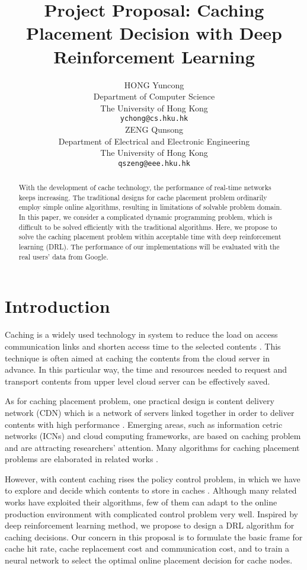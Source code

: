 \documentclass{article}
\title{Project Proposal: Caching Placement Decision with Deep Reinforcement Learning}
\author{
  HONG Yuncong \\ %
  Department of Computer Science \\
  The University of Hong Kong \\
  \texttt{ychong@cs.hku.hk} \\
  \And %
  ZENG Qunsong \\
  Department of Electrical and Electronic Engineering \\
  The University of Hong Kong \\
  \texttt{qszeng@eee.hku.hk} \\
}
\begin{document}
\maketitle

\begin{abstract}
  
  With the development of cache technology, the performance of real-time networks keeps increasing. The traditional designs for cache placement problem ordinarily employ simple online algorithms, resulting in limitations of solvable problem domain. In this paper, we consider a complicated dynamic programming problem, which is difficult to be solved efficiently with the traditional algorithms. Here, we propose to solve the caching placement problem within acceptable time with deep reinforcement learning (DRL). The performance of our implementations will be evaluated with the real users' data from Google.
\end{abstract}

\section{Introduction}

  Caching is a widely used technology in system to reduce the load on access communication links and shorten access time to the selected contents \cite{general-cache}. This technique is often aimed at caching the contents from the cloud server in advance. In this particular way, the time and resources needed to request and transport contents from upper level cloud server can be effectively saved. 
  
  As for caching placement problem, one practical design is content delivery network (CDN) which is a network of servers linked together in order to deliver contents with high performance \cite{cloudflare}. Emerging areas, such as information cetric networks (ICNs) and cloud computing frameworks, \cite{ref1,ref2,ref3,ref4} are based on caching problem and are attracting researchers' attention. Many algorithms for caching placement problems are elaborated in related works \cite{dl-mec,dl-icn,expert-cdn}.
  
However, with content caching rises the policy control problem, in which we have to explore and decide which contents to store in caches \cite{DBLP:journals/corr/abs-1712-08132}. Although many related works have exploited their algorithms, few of them can adapt to the online production environment with complicated control problem very well. Inspired by deep reinforcement learning method, we propose to design a DRL algorithm for caching decisions. Our concern in this proposal is to formulate the basic frame for cache hit rate, cache replacement cost and communication cost, and to train a neural network to select the optimal online placement decision for cache nodes. 
\end{document}
